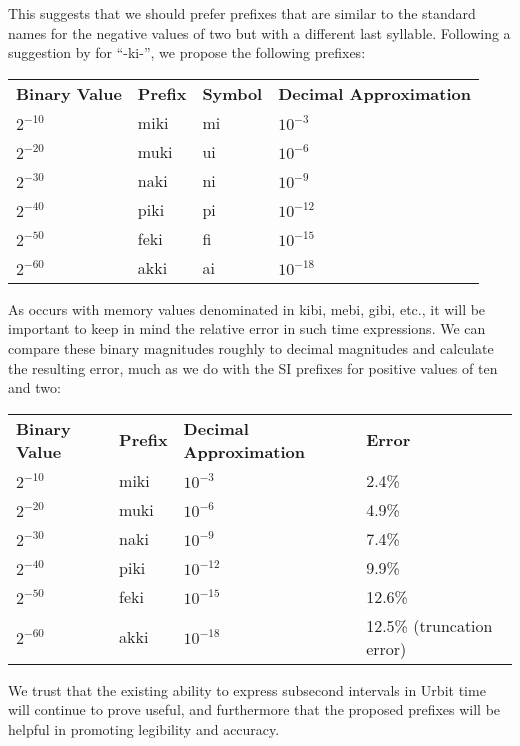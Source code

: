 \documentclass[twoside]{article}
\begin{document}
This suggests that we should prefer prefixes that are similar to the standard names for the negative values of two but with a different last syllable.  Following a suggestion by  for “-ki-”, we propose the following prefixes:

\begin{tabular}{llll}
  \textbf{Binary Value} & \textbf{Prefix} & \textbf{Symbol} & \textbf{Decimal Approximation} \\
  $2^{-10}$ & miki & mi & $10^{-3}$ \\
  $2^{-20}$ & muki & ui & $10^{-6}$ \\
  $2^{-30}$ & naki & ni & $10^{-9}$ \\
  $2^{-40}$ & piki & pi & $10^{-12}$ \\
  $2^{-50}$ & feki & fi & $10^{-15}$ \\
  $2^{-60}$ & akki & ai & $10^{-18}$ \\
\end{tabular}

As occurs with memory values denominated in kibi, mebi, gibi, etc., it will be important to keep in mind the relative error in such time expressions.  We can compare these binary magnitudes roughly to decimal magnitudes and calculate the resulting error, much as we do with the SI prefixes for positive values of ten and two:

\begin{tabular}{llll}
  \textbf{Binary Value} & \textbf{Prefix} & \textbf{Decimal Approximation} & \textbf{Error} \\
  $2^{-10}$ & miki & $10^{-3}$ & 2.4\% \\
  $2^{-20}$ & muki & $10^{-6}$ & 4.9\% \\
  $2^{-30}$ & naki & $10^{-9}$ & 7.4\% \\
  $2^{-40}$ & piki & $10^{-12}$ & 9.9\% \\
  $2^{-50}$ & feki & $10^{-15}$ & 12.6\% \\
  $2^{-60}$ & akki & $10^{-18}$ & 12.5\% (truncation error) \\
\end{tabular}

We trust that the existing ability to express subsecond intervals in Urbit time will continue to prove useful, and furthermore that the proposed prefixes will be helpful in promoting legibility and accuracy.

\printbibliography
\end{document}
